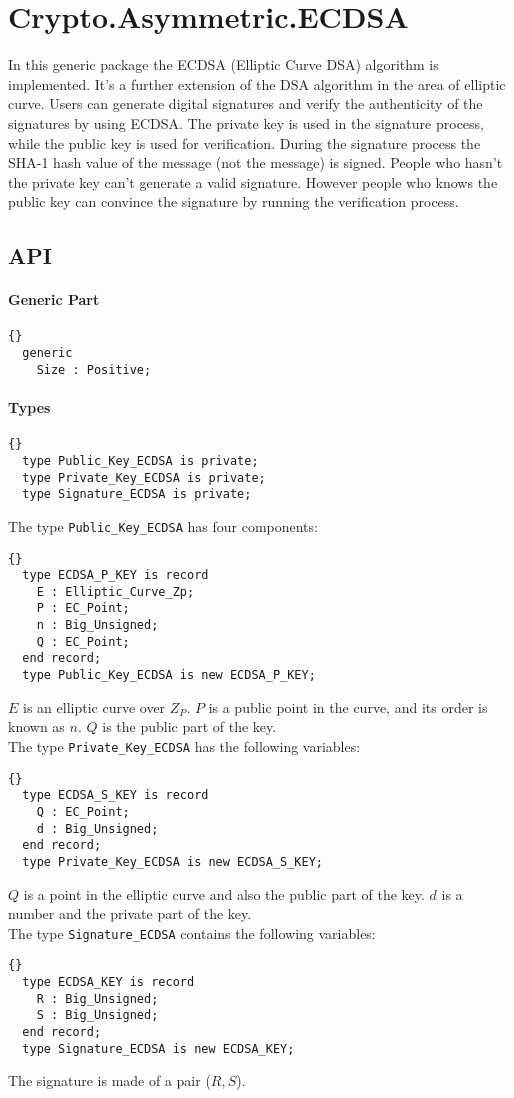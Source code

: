 \chapter{Crypto.Asymmetric.ECDSA}
In this generic package the ECDSA (Elliptic Curve DSA) algorithm is
implemented. It's a further extension of the DSA algorithm in the area
of elliptic curve. Users can generate digital signatures and verify
the authenticity of the signatures by using ECDSA. The private key is
used in the signature process, while the public key is used for
verification. During the signature process the SHA-1 hash value of the
message (not the message) is signed. People who hasn't the private key
can't generate a valid signature. However people who knows the public
key can convince the signature by running the verification process.
\section{API}
\subsubsection*{Generic Part}
\begin{lstlisting}{}
  generic
    Size : Positive;
\end{lstlisting}
\subsubsection*{Types}
\begin{lstlisting}{}
  type Public_Key_ECDSA is private;
  type Private_Key_ECDSA is private;
  type Signature_ECDSA is private;
\end{lstlisting}
The type \texttt{Public\_Key\_ECDSA} has four components:
\begin{lstlisting}{}
  type ECDSA_P_KEY is record
    E : Elliptic_Curve_Zp;
    P : EC_Point;
    n : Big_Unsigned;
    Q : EC_Point;
  end record;
  type Public_Key_ECDSA is new ECDSA_P_KEY;
\end{lstlisting}
$E$ is an elliptic curve over $Z_P$. $P$ is a public point in the
curve, and its order is known as $n$. $Q$ is the public part of the
key. \\ The type \texttt{Private\_Key\_ECDSA} has the following
variables:
\begin{lstlisting}{}
  type ECDSA_S_KEY is record
    Q : EC_Point;
    d : Big_Unsigned;
  end record;
  type Private_Key_ECDSA is new ECDSA_S_KEY;
\end{lstlisting}
$Q$ is a point in the elliptic curve and also the public part of the
key. $d$ is a number and the private part of the key.\\ The type
\texttt{Signature\_ECDSA} contains the following variables:
\begin{lstlisting}{}
  type ECDSA_KEY is record
    R : Big_Unsigned;
    S : Big_Unsigned;
  end record;
  type Signature_ECDSA is new ECDSA_KEY;
\end{lstlisting}
The signature is made of a pair ($R,S$).\\
